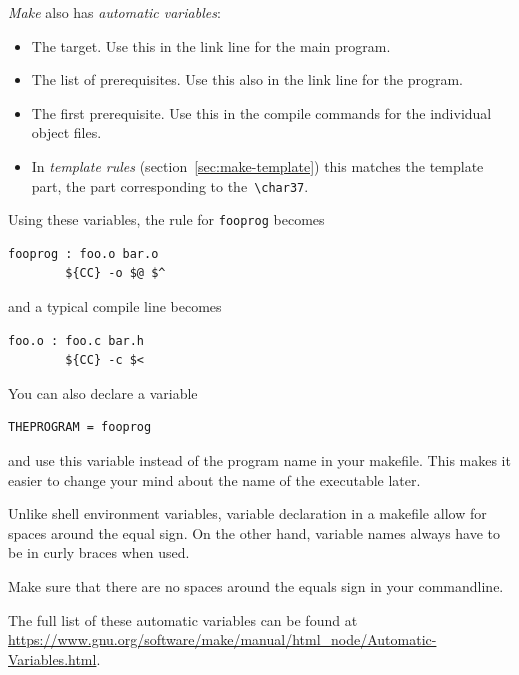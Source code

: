 \emph{Make} also has \emph{automatic variables}:
\begin{itemize}
\item [\n{\$@}] The target. Use this in the link line for the main
  program. %
\item [\n{\$\char`\^}] The list of prerequisites. Use this also in the link
  line for the program.
\item [\n{\$<}] The first prerequisite. Use this in the compile
  commands for the individual object files.
\item [\n{\$*}] In \emph{template rules}
  (section~\ref{sec:make-template}) this matches the template part,
  the part corresponding to the~\lstinline{\char37}.
\end{itemize}
Using these variables, the rule for \lstinline{fooprog} becomes
\begin{lstlisting}
fooprog : foo.o bar.o
        ${CC} -o $@ $^
\end{lstlisting}
and a typical compile line becomes
\begin{lstlisting}
foo.o : foo.c bar.h
        ${CC} -c $<
\end{lstlisting}

You can also declare a variable
\begin{lstlisting}
THEPROGRAM = fooprog
\end{lstlisting}
and use this variable instead of the program name in your
makefile. This makes it easier to change your mind about the name of
the executable later. 

\begin{remark}
  Unlike shell environment variables, variable declaration in a makefile
  allow for spaces around the equal sign.
  On the other hand, variable names always have to be in curly braces
  when used.
\end{remark}

  {Make sure that there are no spaces
  around the equals sign in your commandline.}

The full list of these automatic variables can be found at
\url{https://www.gnu.org/software/make/manual/html_node/Automatic-Variables.html}.

